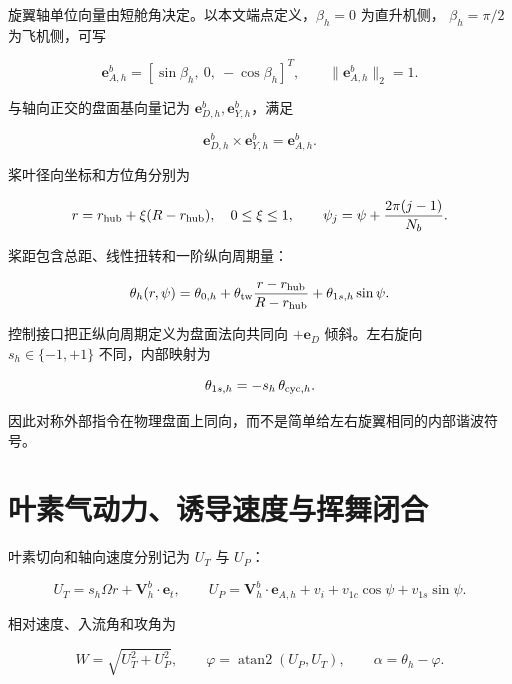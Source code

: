 \documentclass[UTF8,12pt,oneside,openany,fontset=windows]{ctexbook}
\begin{document}
旋翼轴单位向量由短舱角决定。以本文端点定义，\(\beta_h=0\) 为直升机侧， \(\beta_h=\pi/2\) 为飞机侧，可写

\begin{equation}
\mathbf e_{A,h}^b=[\sin\beta_h,\ 0,\ -\cos\beta_h]^T,\qquad
\|\mathbf e_{A,h}^b\|_2=1.
\end{equation}

与轴向正交的盘面基向量记为 \(\mathbf e_{D,h}^b,\mathbf e_{Y,h}^b\)，满足

\begin{equation}
\mathbf e_{D,h}^b\times\mathbf e_{Y,h}^b=\mathbf e_{A,h}^b.
\end{equation}

桨叶径向坐标和方位角分别为

\begin{equation}
r=r_{\rm hub}+\xi(R-r_{\rm hub}),\quad 0\le\xi\le1,\qquad
\psi_j=\psi+\frac{2\pi(j-1)}{N_b}.
\end{equation}

桨距包含总距、线性扭转和一阶纵向周期量：

\begin{equation}
\theta_h(r,\psi)=\theta_{0,h}+\theta_{\rm tw}\frac{r-r_{\rm hub}}{R-r_{\rm hub}}
+\theta_{1s,h}\sin\psi .
\end{equation}

控制接口把正纵向周期定义为盘面法向共同向 \(+\mathbf e_D\) 倾斜。左右旋向 \(s_h\in\{-1,+1\}\) 不同，内部映射为

\begin{equation}
\theta_{1s,h}=-s_h\,\theta_{{\rm cyc},h}.
\end{equation}

因此对称外部指令在物理盘面上同向，而不是简单给左右旋翼相同的内部谐波符号。

\section{叶素气动力、诱导速度与挥舞闭合}

叶素切向和轴向速度分别记为 \(U_T\) 与 \(U_P\)：

\begin{equation}
U_T=s_h\Omega r+\mathbf V_h^b\cdot\mathbf e_t,\qquad
U_P=\mathbf V_h^b\cdot\mathbf e_{A,h}+v_i+v_{1c}\cos\psi+v_{1s}\sin\psi.
\end{equation}

相对速度、入流角和攻角为

\begin{equation}
W=\sqrt{U_T^2+U_P^2},\qquad
\varphi=\operatorname{atan2}(U_P,U_T),\qquad
\alpha=\theta_h-\varphi .
\end{equation}
\end{document}
